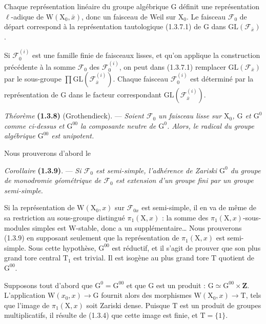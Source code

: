 \documentclass[11pt,leqno]{article}
\begin{document}
Chaque représentation linéaire du groupe algébrique \(\mathrm{G}\) définit une représentation \(\ell\)-adique de \(\mathrm{W}(\mathrm{X}_0,\bar{x})\), donc un faisceau de Weil sur \(\mathrm{X}_0\). Le faisceau \(\mathscr{F}_0\) de départ correspond à la représentation tautologique (1.3.7.1) de \(\mathrm{G}\) dans \(\mathrm{GL}(\mathscr{F}_{\bar{x}})\).

Si \(\mathscr{F}_0^{(i)}\) est une famille finie de faisceaux lisses, et qu’on applique la construction précédente à la somme \(\mathscr{F}_0\) des \(\mathscr{F}_0^{(i)}\), on peut dans (1.3.7.1) remplacer \(\mathrm{GL}(\mathscr{F}_{\bar{x}})\) par le sous-groupe \(\prod\mathrm{GL}(\mathscr{F}_{\bar{x}}^{(i)})\). Chaque faisceau \(\mathscr{F}_0^{(i)}\) est déterminé par la représentation de \(\mathrm{G}\) dans le facteur correspondant \(\mathrm{GL}(\mathscr{F}_{\bar{x}}^{(i)})\).

\textit{Théorème} \textbf{(1.3.8)} (Grothendieck). — \textit{Soient \(\mathscr{F}_0\) un faisceau lisse sur \(\mathrm{X}_0\), \(\mathrm{G}\) et \(\mathrm{G}^0\) comme ci-dessus et \(\mathrm{G}^{00}\) la composante neutre de \(\mathrm{G}^0\). Alors, le radical du groupe algébrique \(\mathrm{G}^{00}\) est unipotent.}

Nous prouverons d’abord le

\textit{Corollaire} \textbf{(1.3.9)}. — \textit{Si \(\mathscr{F}_0\) est semi-simple, l’adhérence de Zariski \(\mathrm{G}^0\) du groupe de monodromie géométrique de \(\mathscr{F}_0\) est extension d’un groupe fini par un groupe semi-simple.}

Si la représentation de \(\mathrm{W}(\mathrm{X}_0,x)\) sur \(\mathscr{F}_{0x}\) est semi-simple, il en va de même de sa restriction au sous-groupe distingué \(\pi_1(\mathrm{X},x)\) : la somme des \(\pi_1(\mathrm{X},x)\)-sous-modules simples est \(\mathrm{W}\)-stable, donc a un supplémentaire\ldots{} Nous prouverons (1.3.9) en supposant seulement que la représentation de \(\pi_1(\mathrm{X},x)\) est semi-simple. Sous cette hypothèse, \(\mathrm{G}^{00}\) est réductif, et il s’agit de prouver que son plus grand tore central \(\mathrm{T}_1\) est trivial. Il est isogène au plus grand tore \(\mathrm{T}\) quotient de \(\mathrm{G}^{00}\).

Supposons tout d’abord que \(\mathrm{G}^0=\mathrm{G}^{00}\) et que \(\mathrm{G}\) est un produit : \(\mathrm{G}\simeq\mathrm{G}^{00}\times\mathbf{Z}\). L’application \(\mathrm{W}(x_0,x)\to\mathrm{G}\) fournit alors des morphismes \(\mathrm{W}(\mathrm{X}_0,x)\to\mathrm{T}\), tels que l’image de \(\pi_1(\mathrm{X},x)\) soit Zariski dense. Puisque \(\mathrm{T}\) est un produit de groupes multiplicatifs, il résulte de (1.3.4) que cette image est finie, et \(\mathrm{T}=\{1\}\).
\end{document}
